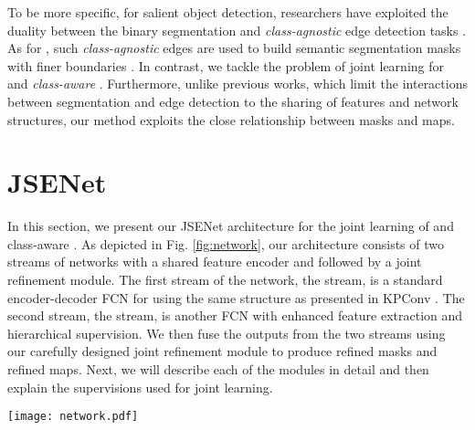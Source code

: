 \documentclass[runningheads]{llncs}
\begin{document}
To be more specific, for salient object detection, researchers have exploited the duality between the binary segmentation and \emph{class-agnostic} edge detection tasks \cite{su2019selectivity,wu2019stacked}. 
As for {\SemSeg}, such \emph{class-agnostic} edges are used to build semantic segmentation masks with finer boundaries \cite{takikawa2019gated,peng2017large,lin2017refinenet,bertasius2016semantic,cheng2017fusionnet}. In contrast, we tackle the problem of joint learning for {\SemSeg} and \emph{class-aware} {\SemEdgeD}. Furthermore, {unlike previous works, which limit the interactions between segmentation and edge detection to the sharing of features and network structures, our method}
exploits the close relationship between {\SemSegPoint} masks and {\SemEdgePoint} maps. 
\section{{JSENet}} \label{JSEnet}


In this section, we present our JSENet architecture for the joint learning of {\SemSeg} and {class-aware} {\SemEdgeD}.
As depicted in Fig. \ref{fig:network}, our architecture consists of two streams of networks with a shared feature encoder and followed by a joint refinement module. The first stream of the network{, the {\SemSeg} stream},  
is a {standard encoder-decoder FCN for {\SemSeg}}
using the same structure as presented in KPConv \cite{thomas2019kpconv}.
{The second stream,
the {\SemEdgeD} stream, is} {another} 
FCN with enhanced feature extraction and hierarchical supervision. We then fuse the outputs from {the two streams}
using our carefully designed {joint} refinement module to produce refined {\SemSegPoint} masks and refined {\SemEdgePoint} maps. Next, we will describe each of the modules in detail and then explain the supervisions used for joint learning.


\begin{figure*}[ht]
    \centering
    \texttt{[image: network.pdf]}
    \caption{
    JSENet architecture. Our architecture consists of two main streams. The {{\SemSeg}} stream can be any fully-convolutional network for {\SemSeg}. The {{\SemEdgeD}} stream extracts enhanced features through a skip-layer structure and is supervised by multiple loss functions. A joint refinement module later combines {the} information from the two streams and outputs refined {\SemSegPoint} masks and {\SemEdgePoint} maps.
    }
    \label{fig:network}
\end{figure*}
\end{document}
